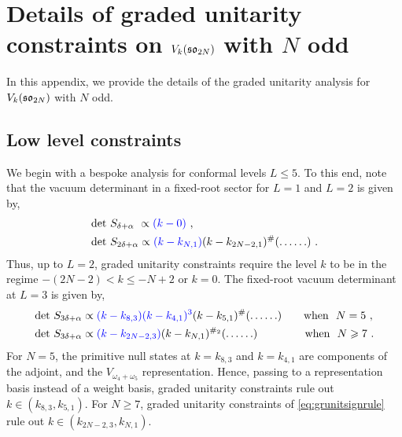 \section{Details of graded unitarity constraints on $V_k(\mathfrak{so}_{2N})$ with $N$ odd} \label{app:VkSOodd}
In this appendix, we provide the details of the graded unitarity analysis for $V_k(\mathfrak{so}_{2N})$ with $N$ odd. 
\subsection{Low level constraints}
We begin with a bespoke analysis for conformal levels $L \leqslant 5$. To this end, note that the vacuum determinant in a fixed-root sector for $L = 1$ and $L = 2$ is given by,
\begin{equation} \label{eq: so2NoddL1to2}
\begin{split}
    &\text{det}~S_{\delta + \alpha} \ \propto \textcolor{blue}{(k - 0)}~, \\
    &\text{det}~S_{2\delta + \alpha} \propto \textcolor{blue}{(k - k_{N,1})}(k-k_{2N-2,1})^{\#} (\ldots \ldots)~. \\ 
\end{split}   
\end{equation}
Thus, up to $L = 2$, graded unitarity constraints require the level $k$ to be in the regime $-(2N-2) < k \leqslant -N+2$ or $k = 0$. The fixed-root vacuum determinant at $L = 3$ is given by,
\begin{equation} \label{eq: so2NoddL3}
\begin{split}
    &\text{det}~S_{3\delta + \alpha} \propto \textcolor{blue}{(k-k_{8,3})(k-k_{4,1})^3}(k-k_{5,1})^{\#}(\ldots\ldots) \qquad \text{when} \ \ N=5~, \\
    &\text{det}~S_{3\delta + \alpha} \propto \textcolor{blue}{(k - k_{2N-2,3})}(k-k_{N,1})^{\#_2} (\ldots \ldots) \qquad \qquad \ \text{when} \ \ N \geqslant 7~.\\ 
\end{split}   
\end{equation}
For $N = 5$, the primitive null states at $k = k_{8,3}$ and $k = k_{4,1}$ are components of the adjoint, and the $V_{\omega_4+\omega_5}$ representation. Hence, passing to a representation basis instead of a weight basis, graded unitarity constraints rule out $k \in (k_{8,3}, k_{5,1})$. For $N \geqslant 7$, graded unitarity constraints of \eqref{eq:grunitsignrule} rule out $k \in (k_{2N-2,3}, k_{N,1})$. 

